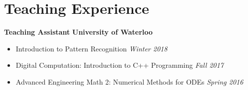 \section*{Teaching Experience}
    \vspace{\postsubhead}
	\textbf{Teaching Assistant}
 	\hfill
    \textbf{University of Waterloo}
      \begin{itemize}
        \item Introduction to Pattern Recognition
          \hfill
      	 \textit{Winter 2018}
      \end{itemize}
	
      \begin{itemize}
        \item Digital Computation: Introduction to C++ Programming
          \hfill
      	 \textit{Fall 2017}

      \end{itemize}
      \begin{itemize}
        \item Advanced Engineering Math 2: Numerical Methods for ODEs
          \hfill
      	 \textit{Spring 2016}
      \end{itemize}
   \vspace{\interlist}
   
      
